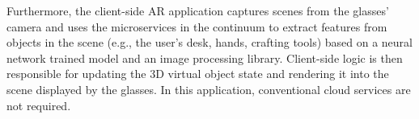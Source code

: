 Furthermore, the client-side AR application captures scenes from the glasses' camera and uses the microservices in the continuum to extract features from objects in the scene (e.g., the user's desk, hands, crafting tools) based on a neural network trained model and an image processing library. Client-side logic is then responsible for updating the 3D virtual object state and rendering it into the scene displayed by the glasses. In this application, conventional cloud services are not required.









